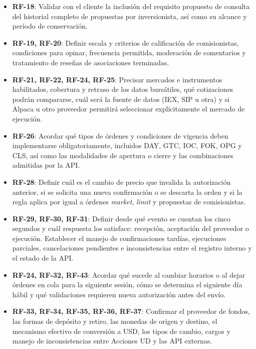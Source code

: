 \documentclass[11pt,a4paper,oneside]{article}
\begin{document}
\begin{itemize}
    \item \textbf{RF-18}: Validar con el cliente la inclusión del requisito propuesto de consulta del historial completo de propuestas por inversionista, así como su alcance y período de conservación.

    \item \textbf{RF-19, RF-20}: Definir escala y criterios de calificación de comisionistas, condiciones para opinar, frecuencia permitida, moderación de comentarios y tratamiento de reseñas de asociaciones terminadas.

    \item \textbf{RF-21, RF-22, RF-24, RF-25}: Precisar mercados e instrumentos habilitados, cobertura y retraso de los datos bursátiles, qué cotizaciones podrán compararse, cuál será la fuente de datos (IEX, SIP u otra) y si Alpaca u otro proveedor permitirá seleccionar explícitamente el mercado de ejecución.

    \item \textbf{RF-26}: Acordar qué tipos de órdenes y condiciones de vigencia deben implementarse obligatoriamente, incluidos DAY, GTC, IOC, FOK, OPG y CLS, así como las modalidades de apertura o cierre y las combinaciones admitidas por la API.

    \item \textbf{RF-28}: Definir cuál es el cambio de precio que invalida la autorización anterior, si se solicita una nueva confirmación o se descarta la orden y si la regla aplica por igual a órdenes \textit{market}, \textit{limit} y propuestas de comisionistas.

    \item \textbf{RF-29, RF-30, RF-31}: Definir desde qué evento se cuentan los cinco segundos y cuál respuesta los satisface: recepción, aceptación del proveedor o ejecución. Establecer el manejo de confirmaciones tardías, ejecuciones parciales, cancelaciones pendientes e inconsistencias entre el registro interno y el estado de la API.

    \item \textbf{RF-24, RF-32, RF-43}: Acordar qué sucede al cambiar horarios o al dejar órdenes en cola para la siguiente sesión, cómo se determina el siguiente día hábil y qué validaciones requieren nueva autorización antes del envío.

    \item \textbf{RF-33, RF-34, RF-35, RF-36, RF-37}: Confirmar el proveedor de fondos, las formas de depósito y retiro, las monedas de origen y destino, el mecanismo efectivo de conversión a USD, los tipos de cambio, cargos y manejo de inconsistencias entre Acciones UD y las API externas.


\end{itemize}
\end{document}
